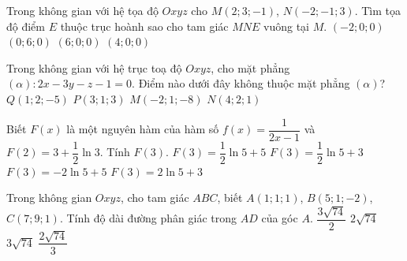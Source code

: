 \begin{ex}%
	Trong không gian với hệ tọa độ $Oxyz$ cho $M(2;3;-1)$, $N(-2;-1;3)$. Tìm tọa độ điểm $E$ thuộc trục hoành sao cho tam giác $MNE$ vuông tại $M$. 
	\choice
	{$(-2;0;0)$}
	{$(0;6;0)$}
	{\True $(6;0;0)$}
	{$(4;0;0)$}
\end{ex}
\begin{ex}%
	Trong không gian với hệ trục toạ độ $Oxyz$, cho mặt phẳng $(\alpha):2x-3y-z-1=0$. Điểm nào dưới đây không thuộc mặt phẳng $(\alpha)$?
	\choice
	{$Q(1;2;-5)$}
	{\True $P(3;1;3)$}
	{$M(-2;1;-8)$}
	{$N(4;2;1)$}
\end{ex}
\begin{ex}%
	Biết $F(x)$ là một nguyên hàm của hàm số $f(x)=\dfrac{1}{2x-1}$ và $F(2)=3+\dfrac{1}{2}\ln3$. Tính $F(3)$. 
	\choice
	{$F(3)=\dfrac{1}{2}\ln5+5$}
	{\True $F(3)=\dfrac{1}{2}\ln5+3$}
	{$F(3)=-2\ln5+5$}
	{$F(3)=2\ln5+3$}
\end{ex}
\begin{ex}%
	Trong không gian $Oxyz$, cho tam giác $ABC$, biết $A(1;1;1)$, $B(5;1;-2)$, $C(7;9;1)$. Tính độ dài đường phân giác trong $AD$ của góc $A$. 
	\choice
	{$\dfrac{3\sqrt{74}}{2}$}
	{$2\sqrt{74}$}
	{$3\sqrt{74}$}
	{\True $\dfrac{2\sqrt{74}}{3}$}
\end{ex}

